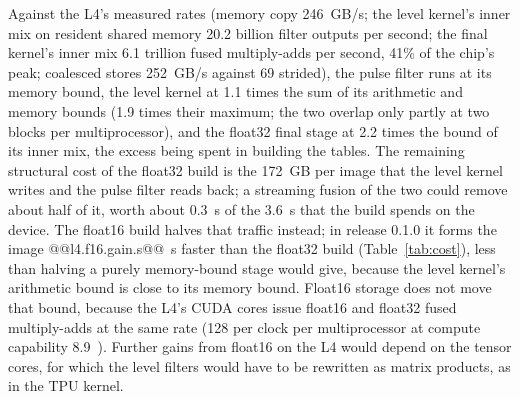\documentclass[11pt]{article}
\begin{document}
Against the L4's measured rates (memory copy 246~GB/s; the level kernel's inner mix on resident shared memory 20.2 billion filter outputs per second; the final kernel's inner mix 6.1 trillion fused multiply-adds per second, 41\% of the chip's peak; coalesced stores 252~GB/s against 69 strided), the pulse filter runs at its memory bound, the level kernel at 1.1 times the sum of its arithmetic and memory bounds (1.9 times their maximum; the two overlap only partly at two blocks per multiprocessor), and the float32 final stage at 2.2 times the bound of its inner mix, the excess being spent in building the tables. The remaining structural cost of the float32 build is the 172~GB per image that the level kernel writes and the pulse filter reads back; a streaming fusion of the two could remove about half of it, worth about 0.3~s of the 3.6~s that the build spends on the device. The float16 build halves that traffic instead; in release 0.1.0 it forms the image @@l4.f16.gain.s@@~s faster than the float32 build (Table~\ref{tab:cost}), less than halving a purely memory-bound stage would give, because the level kernel's arithmetic bound is close to its memory bound. Float16 storage does not move that bound, because the L4's CUDA cores issue float16 and float32 fused multiply-adds at the same rate (128 per clock per multiprocessor at compute capability 8.9~\cite{cudaguide}). Further gains from float16 on the L4 would depend on the tensor cores, for which the level filters would have to be rewritten as matrix products, as in the TPU kernel.
\end{document}

